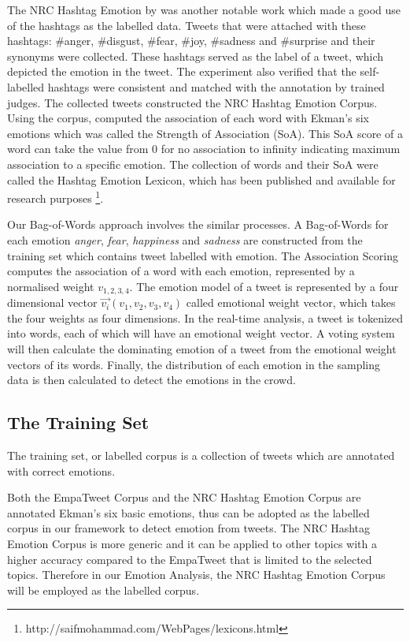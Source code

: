 The NRC Hashtag Emotion by \citep{mohammad2014using} was another notable work which made a good use of the hashtags as the labelled data. Tweets that were attached with these hashtags: \#anger, \#disgust, \#fear, \#joy, \#sadness and \#surprise and their synonyms were collected. These hashtags served as the label of a tweet, which depicted the emotion in the tweet. The experiment also verified that the self-labelled hashtags were consistent and matched with the annotation by trained judges. The collected tweets constructed the NRC Hashtag Emotion Corpus. Using the corpus, \citet{mohammad2014using} computed the association of each word with Ekman's six emotions which was called the Strength of Association (SoA). This SoA score of a word can take the value from 0 for no association to infinity indicating maximum association to a specific emotion. The collection of words and their SoA were called the Hashtag Emotion Lexicon, which has been published and available for research purposes \footnote{http://saifmohammad.com/WebPages/lexicons.html}.

Our Bag-of-Words approach involves the similar processes. A Bag-of-Words for each emotion \textit{anger}, \textit{fear}, \textit{happiness} and \textit{sadness} are constructed from the training set which contains tweet labelled with emotion. The Association Scoring computes the association of a word with each emotion, represented by a normalised weight \(v_{1,2,3,4}\). The emotion model of a tweet is represented by a four dimensional vector \(\vec{v_i}(v_1, v_2, v_3, v_4)\) called emotional weight vector, which takes the four weights as four dimensions. In the real-time analysis, a tweet is tokenized into words, each of which will have an emotional weight vector. A voting system will then calculate the dominating emotion of a tweet from the emotional weight vectors of its words. Finally, the distribution of each emotion in the sampling data is then calculated to detect the emotions in the crowd.

\subsection{The Training Set}
The training set, or labelled corpus is a collection of tweets which are annotated with correct emotions. 

Both the EmpaTweet Corpus and the NRC Hashtag Emotion Corpus are annotated Ekman's six basic emotions, thus can be adopted as the labelled corpus in our framework to detect emotion from tweets. The NRC Hashtag Emotion Corpus is more generic and it can be applied to other topics with a higher accuracy compared to the EmpaTweet that is limited to the selected topics. Therefore in our Emotion Analysis, the NRC Hashtag Emotion Corpus will be employed as the labelled corpus.

